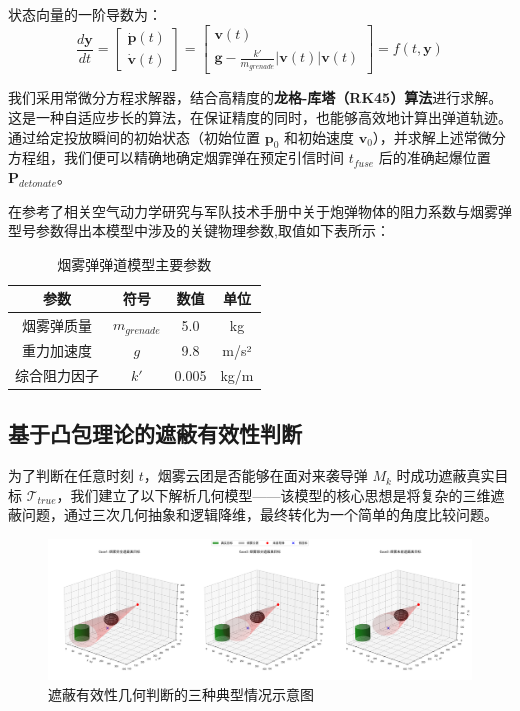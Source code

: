 \documentclass[fontset=SimSun]{ctexart}
\begin{document}
状态向量的一阶导数为：
\begin{equation}
\frac{d\mathbf{y}}{dt} = \begin{bmatrix} \dot{\mathbf{p}}(t) \\ \dot{\mathbf{v}}(t) \end{bmatrix} = \begin{bmatrix} \mathbf{v}(t) \\ \mathbf{g} - \frac{k'}{m_{grenade}} |\mathbf{v}(t)| \mathbf{v}(t) \end{bmatrix} = f(t, \mathbf{y})
\label{eq:state_space_ode}
\end{equation}

我们采用常微分方程求解器，结合高精度的\textbf{龙格-库塔（RK45）算法}进行求解。这是一种自适应步长的算法，在保证精度的同时，也能够高效地计算出弹道轨迹。通过给定投放瞬间的初始状态（初始位置 $\mathbf{p}_0$ 和初始速度 $\mathbf{v}_0$），并求解上述常微分方程组，我们便可以精确地确定烟霏弹在预定引信时间 $t_{fuse}$ 后的准确起爆位置 $\mathbf{P}_{detonate}$。

在参考了相关空气动力学研究\cite{ref_drag_coeff}与军队技术手册\cite{ref_ammo_data}中关于炮弹物体的阻力系数与烟雾弹型号参数得出本模型中涉及的关键物理参数,取值如下表所示：

\begin{table}[H]
\centering
\caption{烟雾弹弹道模型主要参数}
\begin{tabularx}{0.9\textwidth}{c C c c}
\toprule
\textbf{参数} & \textbf{符号} & \textbf{数值} & \textbf{单位} \\
\midrule
烟雾弹质量 & $m_{grenade}$ & 5.0 & kg \\
重力加速度 & $g$ & 9.8 & m/s² \\
综合阻力因子 & $k'$ & 0.005 & kg/m \\
\bottomrule
\end{tabularx}
\label{tab:grenade_params}
\end{table}
\subsection{基于凸包理论的遮蔽有效性判断}

为了判断在任意时刻 $t$，烟雾云团是否能够在面对来袭导弹 $M_k$ 时成功遮蔽真实目标 $\mathcal{T}_{true}$，我们建立了以下解析几何模型——该模型的核心思想是将复杂的三维遮蔽问题，通过三次几何抽象和逻辑降维，最终转化为一个简单的角度比较问题。

\begin{figure}[H]
    \centering
    \includegraphics[width=\textwidth]{1.遮蔽效果对比图(三种情况).png}
    \caption{遮蔽有效性几何判断的三种典型情况示意图}
    \label{fig:obscuration_cases}
\end{figure}
\end{document}
